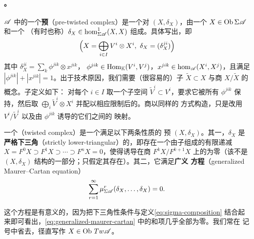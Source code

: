 \paragraph{\trTwistedComplex。}\label{sub:twisted-complexes}
$\mathscr{A}$ 中的一个\textbf{预\trTwistedComplex}（pre-twisted complex）是一个对
$(X,\delta_X)$，由一个\trObject{} $X\in\operatorname{Ob}\Sigma\mathscr{A}$ 和一个\trDifferential%
（有时也称\trConnection）$\delta_X\in\hom^1_{\Sigma\mathscr{A}}(X,X)$ 组成。具体写出，即
\begin{equation}\label{eq:pretwisted-complex}
\Bigl(X=\bigoplus_{i\in I}V^i\otimes X^i,\ \delta_X=(\delta_X^{ji})\Bigr)
\end{equation}
其中 $\delta_X^{ji}=\sum_k\phi^{jik}\otimes x^{jik}$，
$\phi^{jik}\in\operatorname{Hom}_{\mathbb{K}}(V^i,V^j)$，$x^{jik}\in\hom_{\mathscr{A}}(X^i,X^j)$，且满足
$|\phi^{jik}|+|x^{jik}|=1$。出于技术原因，我们需要（很容易的）子\trComplex{}%
$\tilde{X}\subset X$ 与商\trComplex{} $X/\tilde{X}$ 的概念。子\trComplex{}定义如下：
对每个 $i\in I$
取一个子空间 $\tilde{V}^i\subset V^i$，要求它被所有 $\phi^{jik}$ 保持，然后取
$\bigoplus_i\tilde{V}^i\otimes X^i$ 并配以相应限制后的\trDifferential。商\trComplex{}以同样的
方式构造，只是改用\trVectorSpace{} $V^i/\tilde{V}^i$ 以及由 $\phi^{jik}$ 诱导的它们之间的%
\trLinear{}映射。

一个\textbf{\trTwistedComplex}（twisted complex）是一个满足以下两条性质的%
预\trTwistedComplex{} $(X,\delta_X)$。其一，$\delta_X$ 是\textbf{严格下三角}（strictly
lower-triangular）的，即存在一个由子\trComplex{}组成的有限递减\trFiltration
$X=F^0X\supset F^1X\supset\cdots\supset F^nX=0$，使得诱导在商
$F^kX/F^{k+1}X$ 上的\trDifferential{}为零（该\trFiltration{}不是 $(X,\delta_X)$
结构的一部分；只假定其存在）。其二，它满足\textbf{广义 \trMaurerCartan{}方程}（generalized
Maurer--Cartan equation）
\begin{equation}\label{eq:generalized-maurer-cartan}
\sum_{r=1}^{\infty}\mu^r_{\Sigma\mathscr{A}}(\delta_X,\ldots,\delta_X)=0.
\end{equation}

这个方程是有意义的，因为把下三角性条件与定义\eqref{eq:sigma-composition}
结合起来即可看出，\eqref{eq:generalized-maurer-cartan} 中的和项几乎全部为零。我们常在
记号中省去\trDifferential，径直写作 $X\in\operatorname{Ob}\,Tw\mathscr{A}$。

